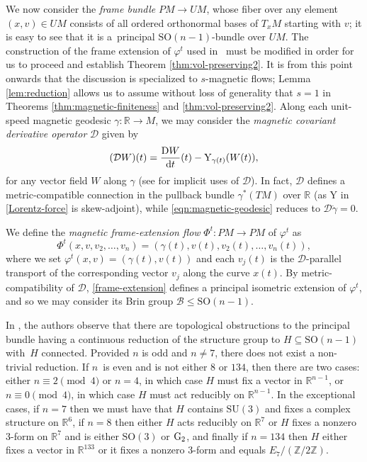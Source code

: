 \documentclass[10pt,a4paper]{amsart}
\newcommand{\Y}{\mathrm{Y}}
\newcommand{\SO}{\text{SO}}
\newcommand{\R}{\mathbb{R}}
\numberwithin{equation}{section}
\theoremstyle{definition}
\begin{document}
We now consider the \emph{frame bundle} $PM\to UM$, whose fiber over any element $(x,v) \in UM$ consists of all ordered orthonormal bases of $T_xM$ starting with $v$; it is easy to see that it is a~principal $\SO(n-1)$-bundle over $UM$. The construction of the frame extension of $\varphi^t$ used in~\cite{filip2024finiteness} must be modified in order for us to proceed and establish Theorem \ref{thm:vol-preserving2}. It is from this point onwards that the discussion is specialized to $s$-magnetic flows; Lemma \ref{lem:reduction} allows us to assume without loss of generality that $s=1$ in Theorems \ref{thm:magnetic-finiteness} and \ref{thm:vol-preserving2}. Along each unit-speed magnetic geodesic $\gamma\colon \R\to M$, we may consider the \emph{magnetic covariant derivative operator} $\mathcal{D}$ given by
\begin{equation}\label{mag-covariant}
 (\mathcal{D}W)(t) = \frac{{\rm D}W}{{\rm d}t}(t) - \Y_{\gamma(t)}(W(t)),
\end{equation}for any vector field $W$ along $\gamma$ (see \cite{assenza-imrn,grognet-etds} for implicit uses of $\mathcal{D}$). In fact, $\mathcal{D}$ defines a metric-compatible connection in the pullback bundle $\gamma^*(TM)$ over $\R$ (as $\Y$ in \eqref{Lorentz-force} is skew-adjoint), while \eqref{eqn:magnetic-geodesic} reduces to $\mathcal{D}\dot{\gamma}=0$.

We define the \emph{magnetic frame-extension flow} $\Phi^t\colon PM\to PM$ of $\varphi^t$ as
 \begin{equation}\label{frame-extension}\Phi^t(x, v, v_2, \ldots, v_n) = (\gamma(t), v(t), v_2(t), \ldots, v_n(t)), \end{equation}
 where we set $\varphi^t(x,v) = (\gamma(t), v(t))$ and each $v_j(t)$ is the $\mathcal{D}$-parallel transport of the corresponding vector $v_j$ along the curve $x(t)$. By metric-compatibility of $\mathcal{D}$, \eqref{frame-extension} defines a principal isometric extension of $\varphi^t$, and so we may consider its Brin group $\mathcal{B} \leq \SO(n-1)$.

 In \cite[Remark 3.3.3]{filip2024finiteness}, the authors observe that there are topological obstructions to the principal bundle having a continuous reduction of the structure group to $H \subseteq\SO(n-1)$ with~$H$ connected. Provided $n$ is odd and $n \neq 7$, there does not exist a non-trivial reduction. If $n$~is even and is not either $8$ or $134$, then there are two cases: either $n \equiv 2 \pmod{4}$ or $n=4$, in which case $H$ must fix a vector in $\mathbb{R}^{n-1}$, or $n \equiv 0 \pmod{4}$, in which case $H$ must act reducibly on $\mathbb{R}^{n-1}$. In the exceptional cases, if $n = 7$ then we must have that $H$ contains $\text{SU}(3)$ and fixes a complex structure on $\mathbb{R}^6$, if $n=8$ then either $H$ acts reducibly on $\mathbb{R}^7$ or $H$ fixes a nonzero $3$-form on $\mathbb{R}^7$ and is either $\SO(3)$ or ${\rm G}_2$, and finally if $n =134$ then $H$ either fixes a vector in $\mathbb{R}^{133}$ or it fixes a nonzero $3$-form and equals $E_7/(\mathbb{Z}/2 \mathbb{Z})$.
\end{document}

